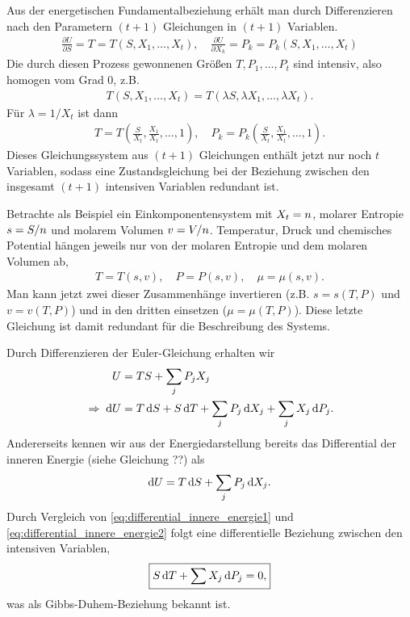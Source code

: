 Aus der energetischen Fundamentalbeziehung erhält man durch Differenzieren nach den Parametern $(t+1)$ Gleichungen in $(t+1)$ Variablen.
\begin{align*}
    \frac{\partial U}{\partial S} = T = T(S,X_1,\ldots ,X_t), \quad
    \frac{\partial U}{\partial X_k} =P_k = P_k(S,X_1,\ldots ,X_t)
\end{align*}
Die durch diesen Prozess gewonnenen Größen $T,P_1,\ldots,P_t$ sind intensiv, also homogen vom Grad $0$, z.B.
\begin{align*}
    T(S,X_1,\ldots ,X_t)=T(\lambda S,\lambda X_1,\ldots ,\lambda X_t).
\end{align*}
Für $\lambda=1/X_t$ ist dann
\begin{align*}
    T = T\left(\frac{S}{X_t},\frac{X_1}{X_t},\ldots ,1\right), \quad P_k=P_k\left(\frac{S}{X_t},\frac{X_1}{X_t},\ldots ,1\right).
\end{align*}
Dieses Gleichungssystem aus $(t+1)$ Gleichungen enthält jetzt nur noch $t$ Variablen, sodass eine Zustandsgleichung bei der Beziehung zwischen den insgesamt $(t+1)$ intensiven Variablen redundant ist.

Betrachte als Beispiel ein Einkomponentensystem mit $X_t=n$, molarer Entropie $s=S/n$ und molarem Volumen $v=V/n$. Temperatur, Druck und chemisches Potential hängen jeweils nur von der molaren Entropie und dem molaren Volumen ab,
\begin{align*}
    T=T(s,v), \quad P=P(s,v), \quad \mu=\mu(s,v).
\end{align*}
Man kann jetzt zwei dieser Zusammenhänge invertieren (z.B. $s=s(T,P)$ und $v=v(T,P)$) und in den dritten einsetzen ($\mu=\mu(T,P)$). Diese letzte Gleichung ist damit redundant für die Beschreibung des Systems.

Durch Differenzieren der Euler-Gleichung erhalten wir
\begin{align}
    U                    & =TS+ \sum_j P_jX_j                                                 \nonumber \\
    \label{eq:differential_innere_energie1}
    \;\Rightarrow\; \mathop{}\!\mathrm{d} U & = T\mathop{}\!\mathrm{d} S + S\mathop{}\!\mathrm{d} T + \sum_j P_j\mathop{}\!\mathrm{d} X_j + \sum_j X_j\mathop{}\!\mathrm{d} P_j.
\end{align}
Andererseits kennen wir aus der Energiedarstellung bereits das Differential der inneren Energie (siehe Gleichung ??) als
\begin{align}
    \label{eq:differential_innere_energie2}
    \mathop{}\!\mathrm{d} U = T\mathop{}\!\mathrm{d} S + \sum_j P_j \mathop{}\!\mathrm{d} X_j.
\end{align}
Durch Vergleich von \eqref{eq:differential_innere_energie1} und \eqref{eq:differential_innere_energie2} folgt eine differentielle Beziehung zwischen den intensiven Variablen,
\begin{align}
    \label{eq:gibbs_duhem}
    \boxed{
        S\mathop{}\!\mathrm{d} T + \sum X_j \mathop{}\!\mathrm{d} P_j = 0,
    }
\end{align}
was als Gibbs-Duhem-Beziehung bekannt ist.

